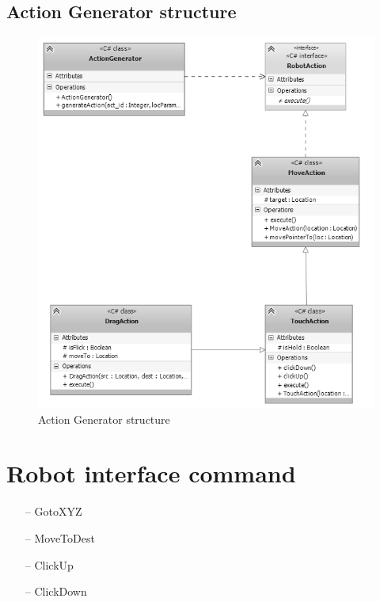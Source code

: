 \subsection{Action Generator structure}

	\begin{figure}[H]
		\centering
		\includegraphics[scale=0.75]{Chapters/Fig/act_gen.png}
		\caption{Action Generator structure}
		\label{fig:act_gen}
	\end{figure}

\section{Robot interface command}

	\begin{itemize}
		\item[--] GotoXYZ
		\item[--] MoveToDest
		\item[--] ClickUp
		\item[--] ClickDown
	\end{itemize}
